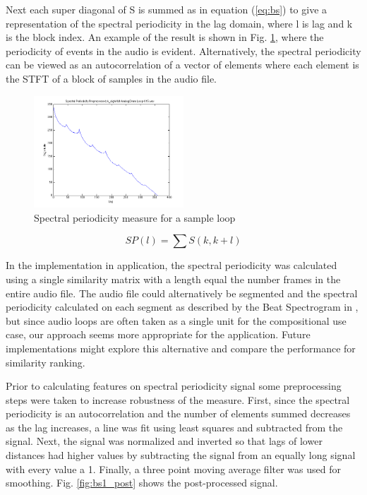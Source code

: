 \documentclass{article}
\begin{document}
Next each super diagonal of S is summed as in equation (\ref{eq:bs}) to give a representation of the spectral periodicity in the lag domain, where l is lag and k is the block index. An example of the result is shown in Fig. \ref{fig:bs1_pre}, where the periodicity of events in the audio is evident. Alternatively, the spectral periodicity can be viewed as an autocorrelation of a vector of elements where each element is the STFT of a block of samples in the audio file.

\begin{figure}[h!]
	
  \centering
    \centerline{\includegraphics[width=0.5\textwidth]{bs_pre.png}}
     \caption{Spectral periodicity measure for a sample loop}\label{fig:bs1_pre}
\end{figure}

\begin{equation}
\label{eq:bs}
SP(l) = \sum S(k, k+l)
\end{equation}

In the implementation in application, the spectral periodicity was calculated using a single similarity matrix with a length equal the number frames in the entire audio file. The audio file could alternatively be segmented and the spectral periodicity calculated on each segment as described by the Beat Spectrogram in \cite{foote2001beat}, but since audio loops are often taken as a single unit for the compositional use case, our approach seems more appropriate for the application. Future implementations might explore this alternative and compare the performance for similarity ranking.

Prior to calculating features on spectral periodicity signal some preprocessing steps were taken to increase robustness of the measure. First, since the spectral periodicity is an autocorrelation and the number of elements summed decreases as the lag increases, a line was fit using least squares and subtracted from the signal. Next, the signal was normalized and inverted so that lags of lower distances had higher values by subtracting the signal from an equally long signal with every value a 1. Finally, a three point moving average filter was used for smoothing. Fig. \ref{fig:bs1_post} shows the post-processed signal.
\end{document}
